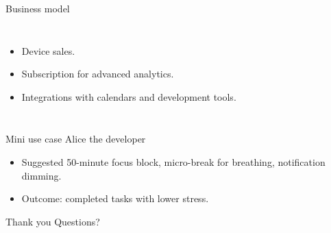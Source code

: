 \documentclass[10pt]{beamer}
\begin{document}
\begin{frame}{Business model}
    \begin{columns}
        \begin{itemize}
            \item Device sales.
            \item Subscription for advanced analytics.
            \item Integrations with calendars and development tools.
        \end{itemize}
    \end{columns}
\end{frame}

\begin{frame}{Mini use case \textendash Alice the developer}
    \vspace{0.2cm}
    \begin{itemize}
        \item Suggested 50-minute focus block, micro-break for breathing, notification dimming.
        \item Outcome: completed tasks with lower stress.
    \end{itemize}
\end{frame}

\begin{frame}{Thank you}
        \vspace{0.4cm}
        \Large{Questions?}
\end{frame}
\end{document}
